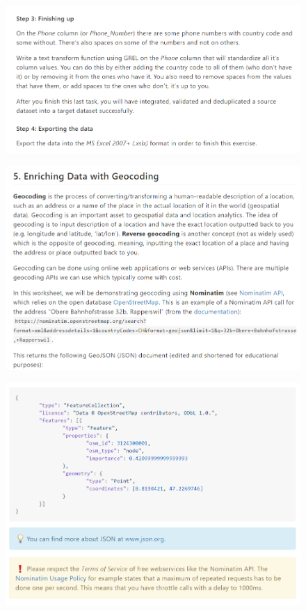 \begin{figure}[H]
    \includegraphics[width=\linewidth]{./Figures/Appendices/worksheet/38.png}
\end{figure}
\begin{figure}[H]
    \includegraphics[width=\linewidth]{./Figures/Appendices/worksheet/39.png}
\end{figure}
\begin{figure}[H]
    \includegraphics[width=\linewidth]{./Figures/Appendices/worksheet/40.png}
\end{figure}
